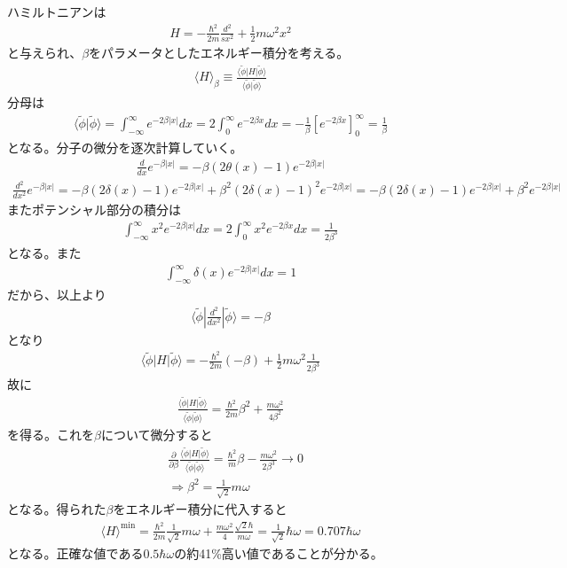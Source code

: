 \documentclass{jlreq}
\begin{document}
ハミルトニアンは
\begin{align}
    H=-\frac{\hbar^2}{2m}\frac{d^2}{sx^2}+\frac{1}{2}m\omega^2x^2
\end{align}
と与えられ、$\beta$をパラメータとしたエネルギー積分を考える。
\begin{align}
    \langle H\rangle_\beta\equiv\frac{\langle\tilde{\phi}|H|\tilde{\phi}\rangle}{\langle\tilde{\phi}|\tilde{\phi}\rangle}
\end{align}
分母は
\begin{align}
    \langle\tilde{\phi}|\tilde{\phi}\rangle=\int^\infty_{-\infty}e^{-2\beta|x|} dx=2\int^\infty_{0}e^{-2\beta x} dx = -\frac{1}{\beta}[e^{-2\beta x}]^\infty_0=\frac{1}{\beta}
\end{align}
となる。分子の微分を逐次計算していく。
\begin{align}
    \frac{d}{dx}e^{-\beta |x|}=-\beta (2\theta(x)-1)e^{-2\beta |x|}
\end{align}
\begin{align}
    \frac{d^2}{dx^2}e^{-\beta |x|}=-\beta (2\delta(x)-1)e^{-2\beta |x|}+\beta^2 (2\delta(x)-1)^2 e^{-2\beta |x|}=-\beta (2\delta(x)-1)e^{-2\beta |x|}+\beta^2 e^{-2\beta |x|}
\end{align} 
またポテンシャル部分の積分は
\begin{align}
    \int^\infty_{-\infty} x^2 e^{-2\beta|x|}dx=2\int^{\infty}_0 x^2 e^{-2\beta x}dx=\frac{1}{2\beta^3}
\end{align}
となる。また
\begin{align}
    \int^\infty_{-\infty} \delta(x) e^{-2\beta|x|}dx=1
\end{align}
だから、以上より
\begin{align}
    \langle\tilde{\phi}|\frac{d^2}{dx^2}|\tilde{\phi}\rangle=-\beta
\end{align}
となり
\begin{align}
    \langle\tilde{\phi}|H|\tilde{\phi}\rangle=-\frac{\hbar^2}{2m}(-\beta)+\frac{1}{2}m\omega^2\frac{1}{2\beta^3}
\end{align}
故に
\begin{align}
    \frac{\langle\tilde{\phi}|H|\tilde{\phi}\rangle}{\langle\tilde{\phi}|\tilde{\phi}\rangle}=\frac{\hbar^2}{2m}\beta^2+\frac{m\omega^2}{4\beta^2}
\end{align}
を得る。これを$\beta$について微分すると
\begin{align}
    &\frac{\partial}{\partial\beta}\frac{\langle\tilde{\phi}|H|\tilde{\phi}\rangle}{\langle\tilde{\phi}|\tilde{\phi}\rangle}=\frac{\hbar^2}{m}\beta-\frac{m\omega^2}{2\beta^3}\rightarrow 0 \\
    &\Rightarrow \beta^2=\frac{1}{\sqrt{2}}m\omega
\end{align}
となる。得られた$\beta$をエネルギー積分に代入すると
\begin{align}
    \langle H\rangle^\text{min}=\frac{\hbar^2}{2m}\frac{1}{\sqrt{2}}m\omega+\frac{m\omega^2}{4} \frac{\sqrt{2}\hbar}{m\omega}=\frac{1}{\sqrt{2}}\hbar\omega=0.707\hbar\omega
\end{align}
となる。正確な値である$0.5\hbar\omega$の約41\%高い値であることが分かる。
\end{document}
